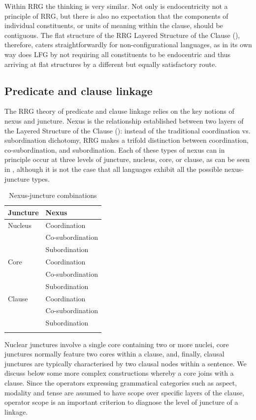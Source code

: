 \documentclass[output=paper,hidelinks]{langscibook}
\begin{document}
Within RRG the thinking is very similar. Not only is endocentricity not a principle of RRG, but there is also no expectation that the components of individual constituents, or units of meaning within the clause, should be contiguous. The flat structure of the RRG Layered Structure of the Clause (), therefore, caters straightforwardly for non-configurational languages, as in its own way does LFG by not requiring all constituents to be endocentric and thus arriving at flat structures by a different but equally satisfactory route.

\subsection{Predicate and clause linkage}
\label{sec:RRG:3.5}

The RRG theory of predicate and clause linkage relies on the key notions of nexus and juncture. Nexus is the relationship established between two layers of the Layered Structure of the Clause (): instead of the traditional coordination vs. subordination dichotomy, RRG makes a trifold distinction between coordination, co-subordination, and subordination. Each of these types of nexus can in principle occur at three levels of juncture, nucleus, core, or clause, as can be seen in , although it is not the case that all languages exhibit all the possible nexus-juncture types.

\begin{table}
\begin{tabular}{ll}
\lsptoprule
{Juncture} & {Nexus}\\\midrule
Nucleus & Coordination\\
& Co-subordination\\
& Subordination\\\midrule
Core & Coordination\\
& Co-subordination\\
& Subordination\\\midrule
Clause & Coordination\\
& Co-subordination\\
& Subordination\\
\lspbottomrule
\end{tabular}
\caption{Nexus-juncture combinations}
\label{tab:RRG:1}
\end{table}

Nuclear junctures involve a single core containing two or more nuclei, core junctures normally feature two cores within a clause, and, finally, clausal junctures are typically characterised by two clausal nodes within a sentence. We discuss below some more complex constructions whereby a core joins with a clause. Since the operators expressing grammatical categories such as aspect, modality and tense are assumed to have scope over specific layers of the clause, operator scope is an important criterion to diagnose the level of juncture of a linkage.
\end{document}
